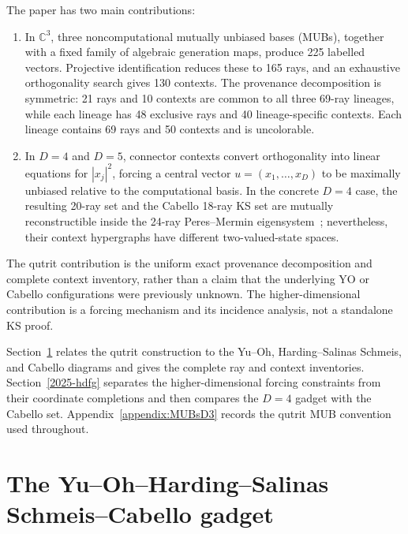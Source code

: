 \documentclass[%
  reprint,
  superscriptaddress,
  showpacs,
  showkeys,
  amsmath,amssymb,
  pra,
  longbibliography,
  floatfix,
  x11names
]{revtex4-2}
\newenvironment{revision}{\begingroup\color{revisionblue}}{\endgroup}
\begin{document}
\begin{revision}
The paper has two main contributions:
\begin{enumerate}
\item In $\mathbb{C}^3$, three noncomputational mutually unbiased bases (MUBs), together with a fixed family of algebraic generation maps, produce 225 labelled vectors.  Projective identification reduces these to 165 rays, and an exhaustive orthogonality search gives 130 contexts.  The provenance decomposition is symmetric: 21 rays and 10 contexts are common to all three 69-ray lineages, while each lineage has 48 exclusive rays and 40 lineage-specific contexts.  Each lineage contains 69 rays and 50 contexts and is uncolorable.
\item In $D=4$ and $D=5$, connector contexts convert orthogonality into linear equations for $|x_j|^2$, forcing a central vector $u=(x_1,\ldots,x_D)$ to be maximally unbiased relative to the computational basis.  In the concrete $D=4$ case, the resulting 20-ray set and the Cabello 18-ray KS set are mutually reconstructible inside the 24-ray Peres--Mermin eigensystem~\cite{peres111,mermin90b,peres-91,pavicic-2004ksafq,cabello-96}; nevertheless, their context hypergraphs have different two-valued-state spaces.
\end{enumerate}

The qutrit contribution is the uniform exact provenance decomposition and complete context inventory, rather than a claim that the underlying YO or Cabello configurations were previously unknown.  The higher-dimensional contribution is a forcing mechanism and its incidence analysis, not a standalone KS proof.

Section~\ref{2025-yohscg} relates the qutrit construction to the Yu--Oh, Harding--Salinas Schmeis, and Cabello diagrams and gives the complete ray and context inventories.  Section~\ref{2025-hdfg} separates the higher-dimensional forcing constraints from their coordinate completions and then compares the $D=4$ gadget with the Cabello set.  Appendix~\ref{appendix:MUBsD3} records the qutrit MUB convention used throughout.
\end{revision}


\section{The Yu--Oh--Harding--Salinas Schmeis--Cabello gadget}
\label{2025-yohscg}
\end{document}
